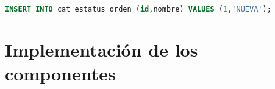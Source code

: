 \begin{lstlisting}[language=SQL, caption={Sentencia insertar un registro.}, captionpos=b, label={lst:sql-insert}]
INSERT INTO cat_estatus_orden (id,nombre) VALUES (1,'NUEVA');
\end{lstlisting}

%

\section{Implementación de los componentes}






